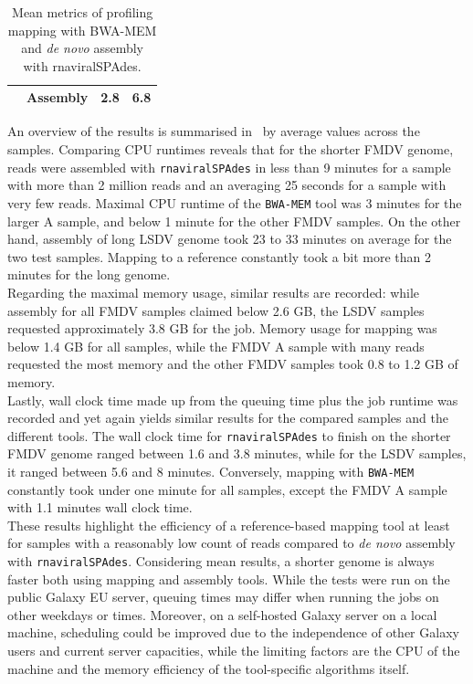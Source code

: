 \begin{table}[ht!]
\begin{tabular}{lccc}
                                                                                                   & Assembly             & 2.8                                                                                               & 6.8                                                                                               \\ \hline
    \end{tabular}
    \caption{Mean metrics of profiling mapping with BWA-MEM and \textit{de novo} assembly with rnaviralSPAdes.}
\label{tab:4-profiling-mean}
\end{table}

An overview of the results is summarised in~ by average values across the samples. Comparing CPU runtimes reveals that for the shorter \ac{FMDV} genome, reads were assembled with \texttt{rnaviralSPAdes} in less than 9 minutes for a sample with more than 2 million reads and an averaging 25 seconds for a sample with very few reads. Maximal CPU runtime of the \texttt{BWA-MEM} tool was 3 minutes for the larger A sample, and below 1 minute for the other \ac{FMDV} samples. On the other hand, assembly of long \ac{LSDV} genome took 23 to 33 minutes on average for the two test samples. Mapping to a reference constantly took a bit more than 2 minutes for the long genome.\\
Regarding the maximal memory usage, similar results are recorded: while assembly for all \ac{FMDV} samples claimed below 2.6 GB, the \ac{LSDV} samples requested approximately 3.8 GB for the job. Memory usage for mapping was below 1.4 GB for all samples, while the \ac{FMDV} A sample with many reads requested the most memory and the other \ac{FMDV} samples took 0.8 to 1.2 GB of memory.\\
Lastly, wall clock time made up from the queuing time plus the job runtime was recorded and yet again yields similar results for the compared samples and the different tools. The wall clock time for \texttt{rnaviralSPAdes} to finish on the shorter \ac{FMDV} genome ranged between 1.6 and 3.8 minutes, while for the \ac{LSDV} samples, it ranged between 5.6 and 8 minutes. Conversely, mapping with \texttt{BWA-MEM} constantly took under one minute for all samples, except the \ac{FMDV} A sample with 1.1 minutes wall clock time. \\
These results highlight the efficiency of a reference-based mapping tool at least for samples with a reasonably low count of reads compared to \textit{de novo} assembly with \texttt{rnaviralSPAdes}. Considering mean results, a shorter genome is always faster both using mapping and assembly tools. While the tests were run on the public Galaxy EU server, queuing times may differ when running the jobs on other weekdays or times. Moreover, on a self-hosted Galaxy server on a local machine, scheduling could be improved due to the independence of other Galaxy users and current server capacities, while the limiting factors are the CPU of the machine and the memory efficiency of the tool-specific algorithms itself.
